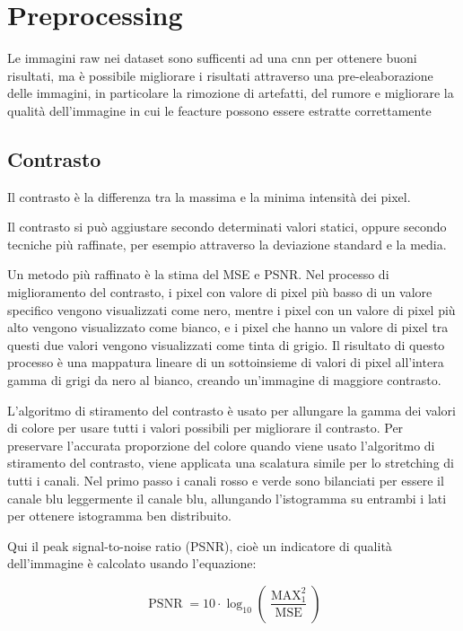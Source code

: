\chapter{Preprocessing}\label{preprocessing}

Le immagini raw nei dataset sono sufficenti ad una \gls{cnn} per ottenere buoni risultati, ma è possibile migliorare i risultati attraverso una pre-eleaborazione delle immagini, in particolare la rimozione di artefatti,  del rumore e migliorare la qualità dell'immagine 
in cui le feacture  possono essere estratte correttamente\cite{permual_contrast}

\section{Contrasto}\label{contrasto}

Il contrasto è la differenza tra la massima e la minima
intensità dei pixel. 

Il contrasto si può aggiustare secondo determinati valori statici, oppure secondo tecniche più raffinate, per esempio attraverso la deviazione standard e la media. 

Un metodo più raffinato è la stima del MSE e PSNR. Nel processo di miglioramento del contrasto, i pixel con
valore di pixel più basso di un valore specifico vengono visualizzati come
nero, mentre i pixel con un valore di pixel più alto vengono
visualizzato come bianco, e i pixel che hanno un valore di pixel
tra questi due valori vengono visualizzati come tinta di grigio.
Il risultato di questo processo è una mappatura lineare di un
sottoinsieme di valori di pixel all'intera gamma di grigi da
nero al bianco, creando un'immagine di maggiore contrasto. 

L'algoritmo di stiramento del contrasto è usato per allungare
la gamma dei valori di colore per usare tutti i valori possibili per
migliorare il contrasto. Per preservare l'accurata proporzione del colore
quando viene usato l'algoritmo di stiramento del contrasto,
viene applicata una scalatura simile per lo stretching di tutti i canali. Nel primo
passo i canali rosso e verde sono bilanciati per essere il canale blu
leggermente il canale blu, allungando l'istogramma su entrambi i lati per ottenere
istogramma ben distribuito.

Qui il peak signal-to-noise ratio (PSNR), cioè un indicatore di qualità dell'immagine è calcolato usando l'equazione:

\[ \operatorname{PSNR}=10 \cdot \log _{10}\left(\frac{\operatorname{MAX}_{1}^{2}}{\operatorname{MSE}}\right) \]

